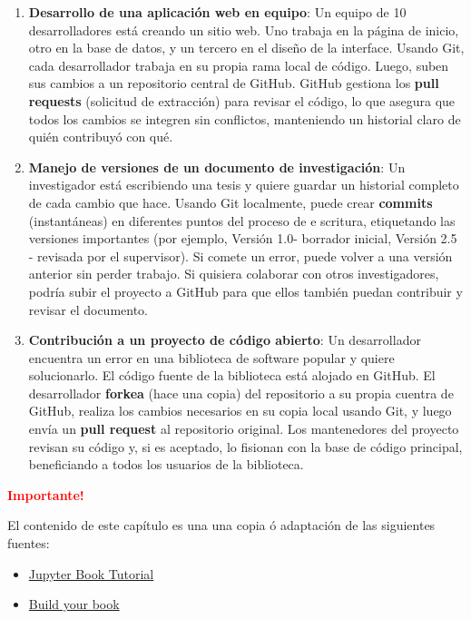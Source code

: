 \begin{justify}
	\begin{enumerate}
		\item {\bf Desarrollo de una aplicación web en equipo}: Un equipo de 10 desarrolladores está creando un sitio
		web. Uno trabaja en la página de inicio, otro en la base de datos, y un tercero en el diseño de la 
		interface. Usando Git, cada desarrollador trabaja en su propia rama local de código. Luego, suben sus
		cambios a un repositorio central de GitHub. GitHub gestiona los {\bf pull requests} (solicitud de extracción)
		para revisar el código, lo que asegura que todos los cambios se integren sin conflictos, manteniendo
		un historial claro de quién contribuyó con qué.
		\item {\bf Manejo de versiones de un documento de investigación}: Un investigador está escribiendo una tesis
		y quiere guardar un historial completo de cada cambio que hace. Usando Git localmente, puede crear {\bf commits}
		(instantáneas) en diferentes puntos del proceso de e scritura, etiquetando las versiones importantes
		(por ejemplo, Versión 1.0- borrador inicial, Versión 2.5 - revisada por el supervisor). Si comete un error, 
		puede volver a una versión anterior sin perder trabajo. Si quisiera colaborar con otros investigadores, podría
		subir el proyecto a GitHub para que ellos también puedan contribuir y revisar el documento.
		\item {\bf Contribución a un proyecto de código abierto}: Un desarrollador encuentra un error en una biblioteca
		de software popular y quiere solucionarlo. El código fuente de la biblioteca está alojado en GitHub. El
		desarrollador {\bf forkea} (hace una copia) del repositorio a su propia cuentra de GitHub, realiza los 
		cambios necesarios en su copia local usando Git, y luego envía un {\bf pull request} al repositorio original.
		Los mantenedores del proyecto revisan su código y, si es aceptado, lo fisionan con la base de código principal,
		beneficiando a todos los usuarios de la biblioteca.
	\end{enumerate}
\end{justify}


\textcolor{red}{\bf Importante!}

El contenido de este capítulo es una una copia ó adaptación de las siguientes fuentes:

\begin{itemize}
	\item[$\bullet$] \href{https://yenchiah.me/jupyter-book-template/docs/home.html}{Jupyter Book Tutorial}
	\item[$\bullet$] \href{https://jupyterbook.org/en/stable/start/build.html}{Build your book}
\end{itemize}

